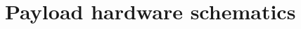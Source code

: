%
%
%
%
%

%
%
%
%
%

\newpage
\appendix

\section{Payload hardware schematics} \label{sec:annex_schematics}

%    




\clearpage